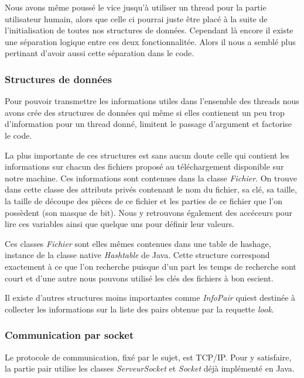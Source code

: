 Nous avons même poussé le vice jusqu'à utiliser un thread pour la
partie utilisateur humain, alors que celle ci pourrai juste être placé
à la suite de l'initialisation de toutes nos structures de
données. Cependant là encore il existe une séparation logique entre
ces deux fonctionnalitée. Alors il nous a semblé plus pertinant
d'avoir aussi cette séparation dans le code.

\subsubsection{Structures de données}
Pour pouvoir transmettre les informations utiles dans l'ensemble des
threads nous avons crée des structures de données qui même si elles
contienent un peu trop d'information pour un thread donné, limitent le
passage d'argument et factorise le code.

La plus importante de ces structures est sans aucun doute celle qui
contient les informations sur chacun des fichiers proposé au
téléchargement disponible sur notre machine. Ces informations sont
contenues dans la classe \textit{Fichier}. On trouve dans cette classe
des attributs privés contenant le nom du fichier, sa clé, sa taille,
la taille de découpe des pièces de ce fichier et les parties de ce
fichier que l'on possèdent (son masque de bit). Nous y retrouvons
également des accéceurs pour lire ces variables ainsi que quelque uns
pour définir leur valeurs. 

Ces classes \textit{Fichier} sont elles mêmes contenues dans une table
de hashage, instance de la classe native \textit{Hashtable} de Java.
Cette structure correspond exactement à ce que l'on recherche puisque
d'un part les temps de recherche sont court et d'une autre nous
pouvons utilisé les clés des fichiers à bon escient.

Il existe d'autres structures moins importantes comme
\textit{InfoPair} quiest destinée à collecter les informations sur la
liste des pairs obtenue par la requette \textit{look}.

%
%


\subsubsection{Communication par socket}
Le protocole de communication, fixé par le sujet, est TCP/IP. Pour y
satisfaire, la partie pair utilise les classes \textit{ServeurSocket}
et \textit{Socket} déjà implémenté en Java.

